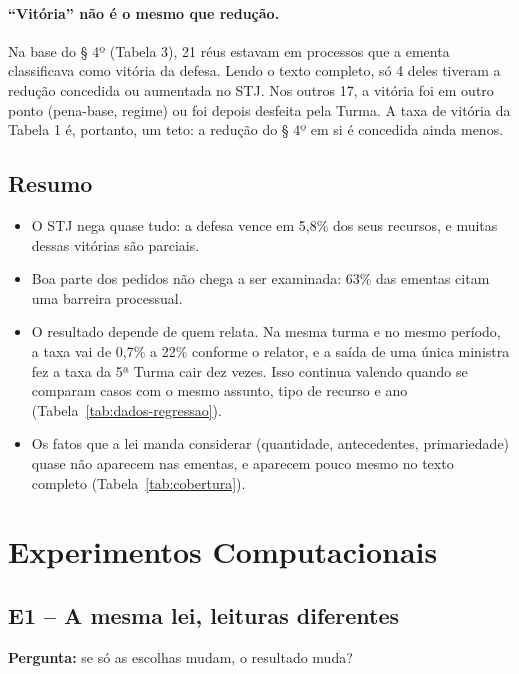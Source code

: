 \paragraph*{``Vitória'' não é o mesmo que redução.} Na base do § 4º (Tabela 3), 21 réus
estavam em processos que a ementa classificava como vitória da defesa. Lendo o texto completo,
só 4 deles tiveram a redução concedida ou aumentada no STJ. Nos outros 17, a vitória foi em
outro ponto (pena-base, regime) ou foi depois desfeita pela Turma. A taxa de vitória da
Tabela 1 é, portanto, um teto: a redução do § 4º em si é concedida ainda menos.

\subsection*{Resumo}

\begin{itemize}
  \item O STJ nega quase tudo: a defesa vence em 5,8\% dos seus recursos, e muitas dessas
        vitórias são parciais.
  \item Boa parte dos pedidos não chega a ser examinada: 63\% das ementas citam uma barreira
        processual.
  \item O resultado depende de quem relata. Na mesma turma e no mesmo período, a taxa vai de
        0,7\% a 22\% conforme o relator, e a saída de uma única ministra fez a taxa da 5ª Turma
        cair dez vezes. Isso continua valendo quando se comparam casos com o mesmo assunto,
        tipo de recurso e ano (Tabela~\ref{tab:dados-regressao}).
  \item Os fatos que a lei manda considerar (quantidade, antecedentes, primariedade) quase não
        aparecem nas ementas, e aparecem pouco mesmo no texto completo
        (Tabela~\ref{tab:cobertura}).
\end{itemize}

\section{Experimentos Computacionais}

\subsection*{E1 -- A mesma lei, leituras diferentes}

\textbf{Pergunta:} se só as escolhas mudam, o resultado muda?

